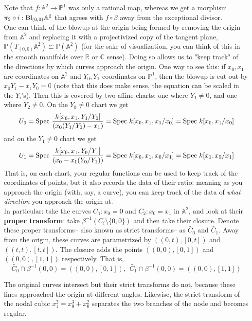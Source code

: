 \documentclass[10pt,reqno]{amsart}
\theoremstyle{definition}
\theoremstyle{remark}
\numberwithin{equation}{section}
\numberwithin{theorem}{section}
\newcommand{\C}{{\mathbb C}}
\newcommand{\spec}{\textup{Spec }}
\newcommand{\R}{{\mathbb R}}
\newcommand{\wt}{\widetilde}
\newcommand{\Bl}{\textup{Bl}}
\newcommand{\A}{{\mathbb A}}
\newcommand{\PP}{{\mathbb P}}
\begin{document}
Note that $f: \A^2 \to \PP^1$ was only a rational map,  whereas we get a morphism $\pi_2 \circ i: \Bl_{(0,0)}\A^2$ that agrees with $f \circ \beta$ away from the exceptional divisor.
\\

One can think of the blowup at the origin being formed by removing the origin from $\A^2$ and replacing it with a projectivized copy of the tangent plane, $\PP(T_{(0,0)}\A^2) \cong \PP(\A^2)$ (for the sake of visualization, you can think of this in the smooth manifolds over $\R$ or $\C$ sense). Doing so allows us to "keep track" of the directions by which curves approach the origin. One way to see this: if $x_0,x_1$ are coordinates on $\A^2$ and $Y_0,Y_1$ coordinates on $\PP^1$, then the blowup is cut out by $x_0Y_1 - x_1Y_0 = 0$ (note that this does make sense, the equation can be scaled in the $Y_i$'s). Then this is covered by two affine charts: one where $Y_1 \ne 0$, and one where $Y_2 \ne 0$. On the $Y_0 \ne 0$ chart we get
\[U_0 = \spec \frac{k[x_0,x_1,Y_1/Y_0]}{(x_0(Y_1/Y_0) - x_1)} = \spec k[x_0,x_1,x_1/x_0] = \spec k[x_0,x_1/x_0] \]
and on the $Y_1 \ne 0$ chart we get
\[U_1 = \spec \frac{k[x_0,x_1,Y_0/Y_1]}{(x_0 - x_1(Y_0/Y_1))} = \spec k[x_0,x_1,x_0/x_1] = \spec k[x_1, x_0/x_1] \] 
That is, on each chart, your regular functions can be used to keep track of the coordinates of points, but it also records the data of their ratio: meaning as you approach the origin (with, say, a curve), you can keep track of the data of \textit{what direction} you approach the origin at. 
\\

In particular: take the curves $C_1: x_0 = 0$ and $C_2: x_0 = x_1$ in $\A^2$, and look at their \textbf{proper transform}: take $\beta^{-1}(C_i \setminus \{0,0\})$ and then take their closure. Denote these proper transforms-- also known as strict transforms-- as $\wt{C_0}$ and  $\wt{C_1}$. Away from the origin, these curves are parametrized by $((0,t), [0,t])$ and $((t,t), [t,t])$. The closure adds the points $((0,0), [0,1])$ and $((0,0), [1,1])$ respectively. That is,
\[\wt{C_0} \cap \beta^{-1}(0,0) = ((0,0), [0,1]), \ \ \wt{C_1} \cap \beta^{-1}(0,0) = ((0,0), [1,1])\]

The original curves intersect but their strict transforms do not, because these lines approached the origin at different angles. Likewise, the strict transform of the nodal cubic $x_1^2 = x_0^3 + x_0^2$ separates the two branches of the node and becomes regular.
\\
\end{document}
